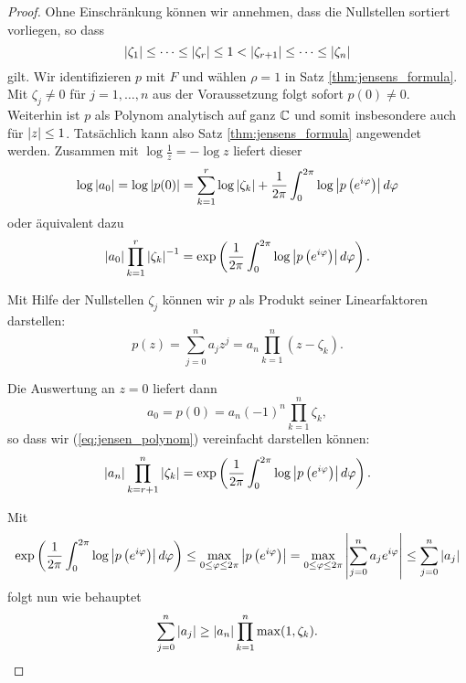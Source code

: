 \begin{proof}
    Ohne Einschränkung können wir annehmen, dass die Nullstellen sortiert
    vorliegen, so dass
    \[
        \left\lvert \zeta_1 \right\rvert \leq \dots \leq \left\lvert \zeta_r \right\rvert \leq 1 < \left\lvert \zeta_{r+1} \right\rvert \leq \dots \leq \left\lvert \zeta_n \right\rvert
    \]
    gilt.
    Wir identifizieren $p$ mit $F$ und wählen $\rho = 1$ in Satz \ref{thm:jensens_formula}.
    Mit $\zeta_j \neq 0$ für $j = 1, \dots, n$ aus der Voraussetzung folgt sofort $p(0) \neq 0$.
    Weiterhin ist $p$ als Polynom analytisch auf ganz $\mathbb{C}$ und somit insbesondere auch für $\left\lvert z \right\rvert \leq 1$.
    Tatsächlich kann also Satz \ref{thm:jensens_formula} angewendet werden.
    Zusammen mit $\log \frac{1}{z} = -\log z$ liefert dieser
    \[
        \log \left\lvert a_0 \right\rvert
        = \log \left\lvert p(0) \right\rvert
        = \sum_{k=1}^{r} \log \left\lvert \zeta_k \right\rvert + \frac{1}{2\pi} \int_{0}^{2\pi} \log \left\lvert p\left( e^{i\varphi} \right) \right\rvert d\varphi
    \]
    oder äquivalent dazu
    \begin{equation}
        \label{eq:jensen_polynom}
        \left\lvert a_0 \right\rvert \prod_{k=1}^{r} \left\lvert \zeta_k \right\rvert^{-1}
        = \exp\left( \frac{1}{2\pi} \int_{0}^{2\pi} \log \left\lvert p\left( e^{i\varphi} \right) \right\rvert d\varphi \right).
    \end{equation}

    \noindent Mit Hilfe der Nullstellen $\zeta_j$ können wir $p$ als Produkt
    seiner Linearfaktoren darstellen:
    \[
        p(z) = \sum_{j = 0}^{n} a_j z^j = a_n \prod_{k=1}^n (z-\zeta_k).
    \]

    \noindent Die Auswertung an $z=0$ liefert dann
    \[
        a_0 = p(0) = a_n (-1)^n \prod_{k=1}^n \zeta_k,
    \]
    so dass wir (\ref{eq:jensen_polynom}) vereinfacht darstellen können:
    \[
        \left\lvert a_n \right\rvert \prod_{k=r+1}^{n} \left\lvert \zeta_k \right\rvert
        = \exp\left( \frac{1}{2\pi} \int_{0}^{2\pi} \log \left\lvert p\left( e^{i\varphi} \right) \right\rvert d\varphi \right).
    \]

    \noindent Mit
    \begin{equation}
        \label{eq:jensen_integral_estimation}
        \exp\left( \frac{1}{2\pi} \int_{0}^{2\pi} \log \left\lvert p\left( e^{i\varphi} \right) \right\rvert d\varphi \right)
        \leq \max_{0 \leq \varphi \leq 2\pi} \left\lvert p\left( e^{i\varphi} \right)  \right\rvert
        = \max_{0 \leq \varphi \leq 2\pi} \left\lvert \sum_{j=0}^{n} a_j e^{i\varphi} \right\rvert
        \leq \sum_{j=0}^{n} \left\lvert a_j \right\rvert
    \end{equation}
    folgt nun wie behauptet
    \[
        \sum_{j=0}^n \left\lvert a_j \right\rvert \geq \left\lvert a_n \right\rvert \prod_{k=1}^n \max(1, \zeta_k).
    \]
\end{proof}

